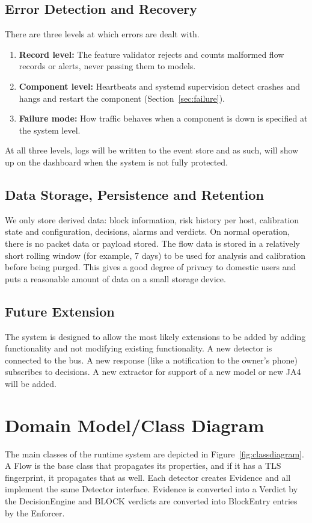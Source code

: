 \subsection{Error Detection and Recovery}\label{sec:6.4.7}
\noindent There are three levels at which errors are dealt with.
\begin{enumerate}
    \item \textbf{Record level:} The feature validator rejects and counts malformed flow records or alerts, never passing them to models.
    \item \textbf{Component level:} Heartbeats and systemd supervision detect crashes and hangs and restart the component (Section~\ref{sec:failure}).
    \item \textbf{Failure mode:} How traffic behaves when a component is down is specified at the system level.
\end{enumerate}
\noindent At all three levels, logs will be written to the event store and as such, will show up on the dashboard when the system is not fully protected.

\subsection{Data Storage, Persistence and Retention}\label{sec:6.4.8}
\label{sec:storage}
\noindent We only store derived data: block information, risk history per host, calibration state and configuration, decisions, alarms and verdicts. On normal operation, there is no packet data or payload stored. The flow data is stored in a relatively short rolling window (for example, 7 days) to be used for analysis and calibration before being purged. This gives a good degree of privacy to domestic users and puts a reasonable amount of data on a small storage device.

\subsection{Future Extension}\label{sec:6.4.9}
\noindent The system is designed to allow the most likely extensions to be added by adding functionality and not modifying existing functionality. A new detector is connected to the bus. A new response (like a notification to the owner's phone) subscribes to decisions. A new extractor for support of a new model or new JA4 will be added.

\section{Domain Model/Class Diagram}\label{sec:6.5}
\label{sec:classdiagram}
\noindent The main classes of the runtime system are depicted in Figure~\ref{fig:classdiagram}. A Flow is the base class that propagates its properties, and if it has a TLS fingerprint, it propagates that as well. Each detector creates Evidence and all implement the same Detector interface. Evidence is converted into a Verdict by the DecisionEngine and BLOCK verdicts are converted into BlockEntry entries by the Enforcer.

